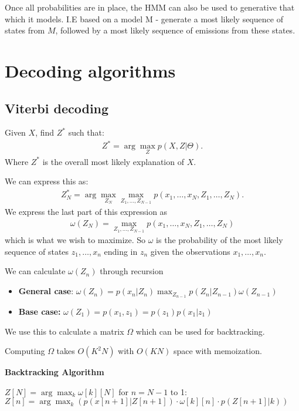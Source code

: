 \documentclass{article}
\begin{document}
  Once all probabilities are in place, the HMM can also be used to generative that which it models. 
  I.E based on a model M - generate a most likely sequence of states from $M$, followed by a most likely sequence of emissions from these states.  


\section{Decoding algorithms}
  \subsection{Viterbi decoding}
    Given $X$, find $Z^*$ such that: 
    \begin{align}
      Z^* = \arg \max_Z p(X,Z|\Theta). 
    \end{align}
    Where $Z^*$ is the overall most likely explanation of $X$.

    We can express this as: 
    \begin{align}
      Z^*_N = \arg \max_{Z_N}\max_{Z_1,\dots,Z_{N-1}} p(x_1,\dots,x_N,Z_1,\dots,Z_N).
    \end{align}
    We express the last part of this expression as
    \begin{align}
      \omega(Z_N) = \max_{Z_1,\dots,Z_{N-1}} p(x_1,\dots,x_N,Z_1,\dots,Z_N) 
    \end{align}
    which is what we wish to maximize. So $\omega$ is the probability of the most likely sequence of states $z_1,\dots,x_n$ ending in $z_n$ given the observations $x_1,\dots,x_n$.


    We can calculate $\omega(Z_n)$ through recursion

      \begin{itemize}
        \item \textbf{General case}: $\omega(Z_n) = p(x_n|Z_n)\max_{Z_{n-1}}p(Z_n|Z_{n-1})\omega(Z_{n-1})$
        \item \textbf{Base case:} $\omega(Z_1) = p(x_1,z_1) = p(z_1)p(x_1|z_1)$
      \end{itemize}

    We use this to calculate a matrix $\Omega$ which can be used for backtracking. 

    Computing $\Omega$ takes $O(K^2N)$ with $O(KN)$ space with memoization.

    \textbf{Backtracking Algorithm}
    \begin{outline}
      \1 $Z[N] = \arg \max_k \omega[k][N]$
      \1 for $n = N-1$ to 1:
        \2 $Z[n] = \arg \max_k (p(x[n+1] | Z[n+1]) \cdot \omega[k][n] \cdot p(Z[n+1] | k))$
    \end{outline}
    
\end{document}
